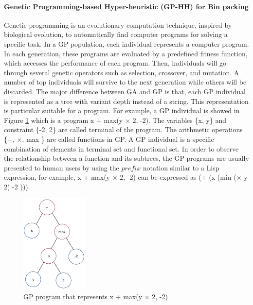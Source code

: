 \paragraph{Genetic Programming-based Hyper-heuristic (GP-HH) for Bin packing}

Genetic programming \cite{1992gppc.book.....K} is an evolutionary computation technique, inspired by biological evolution, to automatically find 
computer programs for solving a specific task. In a GP population, each individual represents a computer program. In each generation, these programs are evaluated by a predefined fitness function, which accesses the performance of each program. Then, individuals will go through several genetic operators such as selection, crossover, and mutation. A number of top individuals will survive to the next generation while others will be discarded. The major difference between GA and GP is that, each GP individual is represented as a tree with variant depth instead of a string. This representation is particular suitable for a program. For example,  a GP individual is showed in Figure \ref{fig:gp_program} which is a program x + max(y $\times$ 2, -2). The variables \{x, y\} and constraint \{-2, 2\} are called terminal of the program. The arithmetic operations \{+, $\times$, max \} are called functions in GP. A GP individual is a specific combination of elements in terminal set and functional set. In order to observe the relationship between a function and its subtrees, the GP programs are usually presented to human users by using the $prefix$ notation similar to a Lisp expression, for example, x + max(y $\times$ 2, -2) can be expressed as (+ (x (min ($\times$ y 2) -2 ))).

\begin{figure}
	\centering
	\includegraphics[width=0.3\textwidth]{pics/gp-tree.png}
	\caption{GP program that represents x + max(y $\times$ 2, -2)}
	\label{fig:gp_program}
\end{figure}


